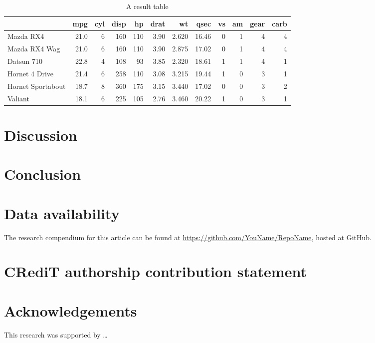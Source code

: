\documentclass[number]{elsarticle} %
\begin{document}
\begin{table}[htbp]

\caption{\label{tab:table}A result table}
\centering
\begin{tabular}[t]{lrrrrrrrrrrr}
\toprule
  & mpg & cyl & disp & hp & drat & wt & qsec & vs & am & gear & carb\\
\midrule
Mazda RX4 & 21.0 & 6 & 160 & 110 & 3.90 & 2.620 & 16.46 & 0 & 1 & 4 & 4\\
Mazda RX4 Wag & 21.0 & 6 & 160 & 110 & 3.90 & 2.875 & 17.02 & 0 & 1 & 4 & 4\\
Datsun 710 & 22.8 & 4 & 108 & 93 & 3.85 & 2.320 & 18.61 & 1 & 1 & 4 & 1\\
Hornet 4 Drive & 21.4 & 6 & 258 & 110 & 3.08 & 3.215 & 19.44 & 1 & 0 & 3 & 1\\
Hornet Sportabout & 18.7 & 8 & 360 & 175 & 3.15 & 3.440 & 17.02 & 0 & 0 & 3 & 2\\
Valiant & 18.1 & 6 & 225 & 105 & 2.76 & 3.460 & 20.22 & 1 & 0 & 3 & 1\\
\bottomrule
\end{tabular}
\end{table}

\hypertarget{discussion}{%
\section{Discussion}\label{discussion}}

\hypertarget{conclusion}{%
\section{Conclusion}\label{conclusion}}

\hypertarget{data-availability}{%
\section*{Data availability}\label{data-availability}}

The research compendium for this article can be found at
\url{https://github.com/YouName/RepoName}, hosted at GitHub.

\hypertarget{credit-authorship-contribution-statement}{%
\section*{CRediT authorship contribution statement}\label{credit-authorship-contribution-statement}}

\hypertarget{acknowledgements}{%
\section*{Acknowledgements}\label{acknowledgements}}

This research was supported by \ldots{}

\renewcommand\refname{References}

\end{document}
